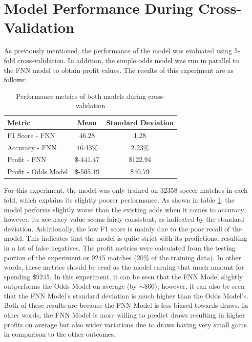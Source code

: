 \documentclass[rgb,listoffigures,listoftables,final]{cam-thesis}
\begin{document}
    \section{Model Performance During Cross-Validation}
    As previously mentioned, the performance of the model was evaluated using 5-fold cross-validation. In addition, the simple odds model was run in parallel to the FNN model to obtain profit values. The results of this experiment are as follows:
    \begin{table}[h]
        \centering
        \caption{Performance metrics of both models during cross-validation}
        \vspace{1em}
        \label{tab:cross-validation-metrics}
        \begin{tabular}{lcc}
            \hline
            Metric                 & Mean      & Standard Deviation \\
            \hline
            F1 Score - FNN         & 46.28     & 1.28               \\
            Accuracy - FNN         & 46.43\%   & 2.23\%             \\
            Profit - FNN           & \$-441.47 & \$122.94           \\
            Profit - Odds Model    & \$-505.19 & \$40.79            \\
            \hline
        \end{tabular}
    \end{table}

    For this experiment, the model was only trained on 32358 soccer matches in each fold, which explains its slightly poorer performance. As shown in table \ref{tab:cross-validation-metrics}, the model performs slightly worse than the existing odds when it comes to accuracy; however, its accuracy value seems fairly consistent, as indicated by the standard deviation. Additionally, the low F1 score is mainly due to the poor recall of the model. This indicates that the model is quite strict with its predictions, resulting in a lot of false negatives. The profit metrics were calculated from the testing portion of the experiment or 9245 matches (20\% of the training data). In other words, these metrics should be read as the model earning that much amount for spending $\$9245$. In this experiment, it can be seen that the FNN Model slightly outperforms the Odds Model on average (by $\sim \$60$); however, it can also be seen that the FNN Model's standard deviation is much higher than the Odds Model's. Both of these results are because the FNN Model is less biased towards draws. In other words, the FNN Model is more willing to predict draws resulting in higher profits on average but also wider variations due to draws having very small gains in comparison to the other outcomes.
    
\end{document}
